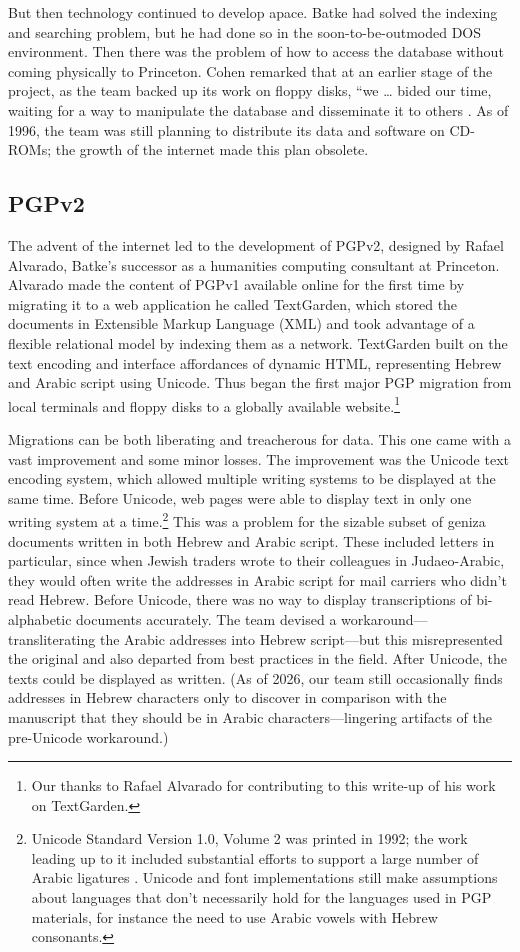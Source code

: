 \documentclass{article}
\begin{document}
But then technology continued to develop apace. Batke had solved the indexing and searching problem, but he had done so in the soon-to-be-outmoded DOS environment. Then there was the problem of how to access the database without coming physically to Princeton. Cohen remarked that at an earlier stage of the project, as the team backed up its work on floppy disks, “we … bided our time, waiting for a way to manipulate the database and disseminate it to others \autocite[40]{cohen_princeton_2014}. As of 1996, the team was still planning to distribute its data and software on CD-ROMs; the growth of the internet made this plan obsolete. 

\subsection{PGPv2}

The advent of the internet led to the development of PGPv2, designed by Rafael Alvarado, Batke’s successor as a humanities computing consultant at Princeton. Alvarado made the content of PGPv1 available online for the first time by migrating it to a web application he called TextGarden, which stored the documents in Extensible Markup Language (XML) and took advantage of a flexible relational model by indexing them as a network. TextGarden built on the text encoding and interface affordances of dynamic HTML, representing Hebrew and Arabic script using Unicode. Thus began the first major PGP migration from local terminals and floppy disks to a globally available website.\footnote{Our thanks to Rafael Alvarado for contributing to this write-up of his work on TextGarden.} 

Migrations can be both liberating and treacherous for data. This one came with a vast improvement and some minor losses. The improvement was the Unicode text encoding system, which allowed multiple writing systems to be displayed at the same time. Before Unicode, web pages were able to display text in only one writing system at a time.\footnote{Unicode Standard Version 1.0, Volume 2 was printed in 1992; the work leading up to it included substantial efforts to support a large number of Arabic ligatures \autocite{noauthor_chronology_nodate}. Unicode and font implementations still make assumptions about languages that don't necessarily hold for the languages used in PGP materials, for instance the need to use Arabic vowels with Hebrew consonants.} This was a problem for the sizable subset of geniza documents written in both Hebrew and Arabic script. These included letters in particular, since when Jewish traders wrote to their colleagues in Judaeo-Arabic, they would often write the addresses in Arabic script for mail carriers who didn't read Hebrew. Before Unicode, there was no way to display transcriptions of bi-alphabetic documents accurately. The team devised a workaround—transliterating the Arabic addresses into Hebrew script—but this misrepresented the original and also departed from best practices in the field. After Unicode, the texts could be displayed as written. (As of 2026, our team still occasionally finds addresses in Hebrew characters only to discover in comparison with the manuscript that they should be in Arabic characters—lingering artifacts of the pre-Unicode workaround.) 
\end{document}
